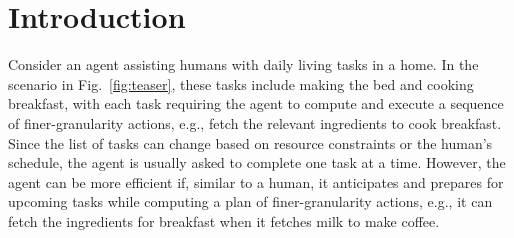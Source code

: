 \section{Introduction}
Consider an agent assisting humans with daily living tasks in a home. %
In the scenario in Fig.~\ref{fig:teaser}, these tasks include making the bed and cooking breakfast, with each task requiring the agent to compute and execute a sequence of finer-granularity actions, e.g., fetch the relevant ingredients to cook breakfast. Since the list of tasks can change based on resource constraints or the human's schedule, the agent is usually asked to complete one task at a time. However, the agent can be more efficient if, similar to a human, it anticipates and prepares for upcoming tasks while computing a plan of finer-granularity actions, e.g., it can fetch the ingredients for breakfast when it fetches milk to make coffee.\\
